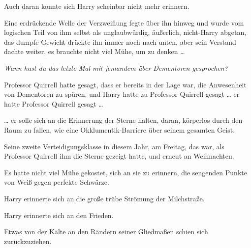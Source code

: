 Auch daran konnte sich Harry scheinbar nicht mehr erinnern.

Eine erdrückende Welle der Verzweiflung fegte über ihn hinweg und wurde vom logischen Teil von ihm selbst als unglaubwürdig, äußerlich, nicht-Harry abgetan, das dumpfe Gewicht drückte ihn immer noch nach unten, aber sein Verstand dachte weiter, es brauchte nicht viel Mühe, um zu denken …

\emph{Wann hast du das letzte Mal mit jemandem über Dementoren gesprochen?}

Professor Quirrell hatte gesagt, dass er bereits in der Lage war, die Anwesenheit von Dementoren zu spüren, und Harry hatte zu Professor Quirrell gesagt … er hatte Professor Quirrell gesagt …

… er solle sich an die Erinnerung der Sterne halten, daran, körperlos durch den Raum zu fallen, wie eine Okklumentik-Barriere über seinem gesamten Geist.

Seine zweite Verteidigungsklasse in diesem Jahr, am Freitag, das war, als Professor Quirrell ihm die Sterne gezeigt hatte, und erneut an Weihnachten.

Es hatte nicht viel Mühe gekostet, sich an sie zu erinnern, die sengenden Punkte von Weiß gegen perfekte Schwärze.

Harry erinnerte sich an die große trübe Strömung der Milchstraße.

Harry erinnerte sich an den Frieden.

Etwas von der Kälte an den Rändern seiner Gliedmaßen schien sich zurückzuziehen.

